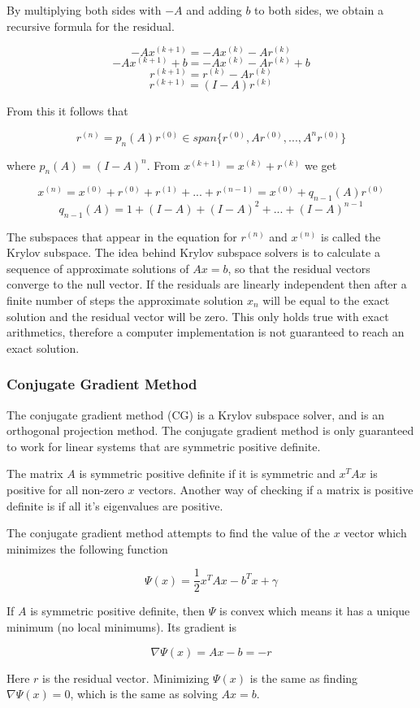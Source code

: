 By multiplying both sides with $-A$ and adding $b$ to both sides, we obtain a 
recursive formula for the residual.

$$ -Ax^{(k+1)} = -Ax^{(k)} - Ar^{(k)} $$
$$ -Ax^{(k+1)} + b = -Ax^{(k)} - Ar^{(k)} + b $$
$$ r^{(k+1)} = r^{(k)} - Ar^{(k)} $$
$$ r^{(k+1)} = (I - A)r^{(k)} $$

From this it follows that 

$$ r^{(n)} = p_n(A)r^{(0)} \in span \{r^{(0)}, Ar^{(0)}, ..., A^{n}r^{(0)}\} $$

where $p_n(A) = (I - A)^n$. From $ x^{(k+1)} = x^{(k)} + r^{(k)} $ we get 

$$ x^{(n)} = x^{(0)} + r^{(0)} + r^{(1)} + ... + r^{(n-1)} = x^{(0)} + q_{n-1}(A)r^{(0)} $$
$$ q_{n-1}(A) = 1 + (I-A) + (I-A)^2 + ... + (I-A)^{n-1} $$

The subspaces that appear in the equation for $r^{(n)}$ and $x^{(n)}$ is called the 
Krylov subspace. The idea behind Krylov subspace solvers is to calculate a sequence 
of approximate solutions of $Ax = b$, so that the residual vectors converge to the 
null vector. If the residuals are linearly independent then 
after a finite number of steps the approximate solution $x_n$ will be equal to the 
exact solution and the residual vector will be zero. This only holds true with exact 
arithmetics, therefore a computer implementation is not guaranteed to reach an exact 
solution\cite{krylovSolvers}.

\subsubsection{Conjugate Gradient Method}

The conjugate gradient method (CG) is a Krylov subspace solver, and is an orthogonal 
projection method. The conjugate gradient method is only guaranteed to work for 
linear systems that are symmetric positive definite.

The matrix $A$ is symmetric positive definite if it is symmetric and $x^T A x$ is 
positive for all non-zero $x$ vectors. Another way of checking if a matrix is 
positive definite is if all it's eigenvalues are positive. 

The conjugate gradient method attempts to find the value of the $x$ vector which 
minimizes the following function

$$ \Psi(x) = \frac{1}{2}x^T A x - b^T x + \gamma $$

If $A$ is symmetric positive definite, then $\Psi$ is convex which means it has 
a unique minimum (no local minimums). Its gradient is 

$$ \nabla \Psi(x) = Ax - b = -r $$

Here $r$ is the residual vector. Minimizing $\Psi(x)$ is the same as finding 
$\nabla \Psi(x) = 0$, which is the same as solving $Ax = b$.

